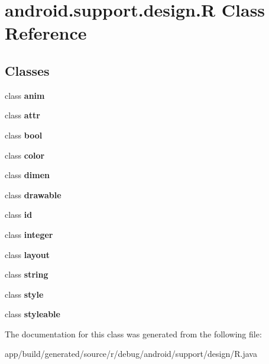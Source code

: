 \hypertarget{classandroid_1_1support_1_1design_1_1R}{}\section{android.\+support.\+design.\+R Class Reference}
\label{classandroid_1_1support_1_1design_1_1R}
\subsection*{Classes}
\begin{DoxyCompactItemize}
\item 
class {\bfseries anim}
\item 
class {\bfseries attr}
\item 
class {\bfseries bool}
\item 
class {\bfseries color}
\item 
class {\bfseries dimen}
\item 
class {\bfseries drawable}
\item 
class {\bfseries id}
\item 
class {\bfseries integer}
\item 
class {\bfseries layout}
\item 
class {\bfseries string}
\item 
class {\bfseries style}
\item 
class {\bfseries styleable}
\end{DoxyCompactItemize}


The documentation for this class was generated from the following file\+:\begin{DoxyCompactItemize}
\item 
app/build/generated/source/r/debug/android/support/design/R.\+java\end{DoxyCompactItemize}
